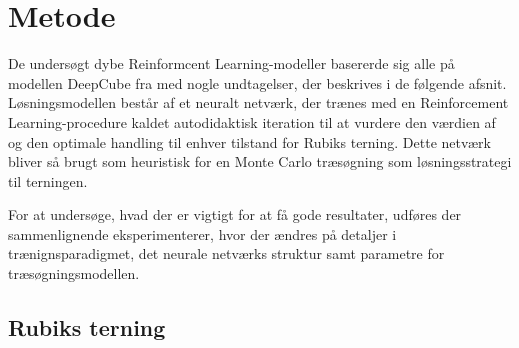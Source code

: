 \documentclass[../main.tex]{subfiles}
\begin{document}
\chapter{Metode}
De undersøgt dybe Reinformcent Learning-modeller basererde sig alle på modellen DeepCube fra \cite{HumansBeGone} med nogle undtagelser, der beskrives i de følgende afsnit. Løsningsmodellen består af et neuralt netværk, der trænes med en Reinforcement Learning-procedure kaldet autodidaktisk iteration til at vurdere den værdien af og den optimale handling til enhver tilstand for Rubiks terning. Dette netværk bliver så brugt som heuristisk for en Monte Carlo træsøgning som løsningsstrategi til terningen.

For at undersøge, hvad der er vigtigt for at få gode resultater, udføres der sammenlignende eksperimenterer, hvor der ændres på detaljer i trænignsparadigmet, det neurale netværks struktur samt parametre for træsøgningsmodellen.
\section{Rubiks terning}\label{sec:environment}
\end{document}
